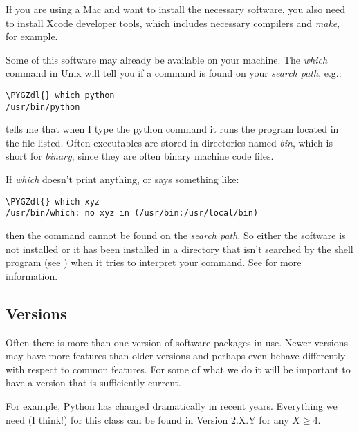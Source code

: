 \documentclass[letterpaper,10pt,english]{sphinxmanual}
\def\PYGZdl{\char`\$}
\begin{document}
If you are using a Mac and want to install the necessary software, you also
need to install \href{https://developer.apple.com/xcode/}{Xcode} developer
tools, which includes necessary compilers and \emph{make}, for example.

Some of this software may already be available on your machine.  The \emph{which}
command in Unix will tell you if a command is found on your \emph{search path},
e.g.:

\begin{Verbatim}[commandchars=\\\{\}]
\PYGZdl{} which python
/usr/bin/python
\end{Verbatim}

tells me that when I type the python command it runs the program located in
the file listed. Often executables are stored in directories named \emph{bin},
which is short for \emph{binary}, since they are often binary machine code files.

If \emph{which} doesn't print anything, or says something like:

\begin{Verbatim}[commandchars=\\\{\}]
\PYGZdl{} which xyz
/usr/bin/which: no xyz in (/usr/bin:/usr/local/bin)
\end{Verbatim}

then the command cannot be found on the \emph{search path}.  So either the
software is not installed or it has been installed in a directory that isn't
searched by the shell program (see {\hyperref[shells:shells]{}}) when it tries to interpret
your command.  See {\hyperref[unix:unix\string-path]{}} for more information.


\subsection{Versions}
\label{software_installation:versions}
Often there is more than one version of software packages in use.  Newer
versions may have more features than older versions and perhaps even behave
differently with respect to common features.  For some of what we do it will
be important to have a version that is sufficiently current.

For example, Python has changed dramatically in recent years.  Everything we
need (I think!) for this class can be found in
Version 2.X.Y for any \(X \geq 4\).
\end{document}
